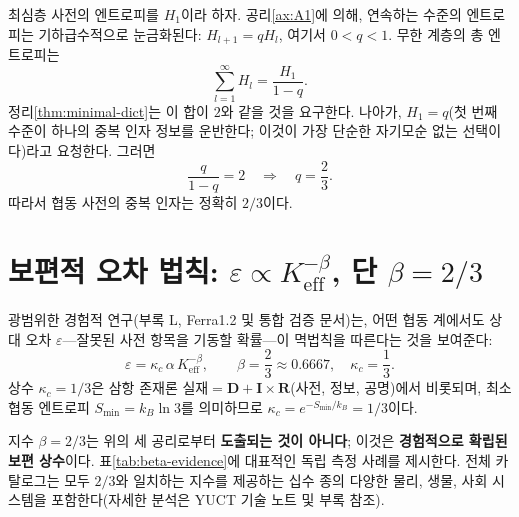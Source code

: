 \documentclass[12pt,a4paper]{article}
\begin{document}
	최심층 사전의 엔트로피를 \(H_1\)이라 하자. 공리\ref{ax:A1}에 의해, 연속하는 수준의 엔트로피는 기하급수적으로 눈금화된다: \(H_{l+1} = q H_l\), 여기서 \(0 < q < 1\). 무한 계층의 총 엔트로피는
	\[
	\sum_{l=1}^{\infty} H_l = \frac{H_1}{1-q}.
	\]
	정리\ref{thm:minimal-dict}는 이 합이 \(2\)와 같을 것을 요구한다. 나아가, \(H_1 = q\)(첫 번째 수준이 하나의 중복 인자 정보를 운반한다; 이것이 가장 단순한 자기모순 없는 선택이다)라고 요청한다. 그러면
	\begin{equation}
		\frac{q}{1-q} = 2 \quad\Longrightarrow\quad \boxed{q = \frac{2}{3}}.
		\label{eq:q}
	\end{equation}
	따라서 협동 사전의 중복 인자는 정확히 \(2/3\)이다.
	
	\section{보편적 오차 법칙: \(\varepsilon \propto K_{\mathrm{eff}}^{-\beta}\), 단 \(\beta = 2/3\)}
	
	광범위한 경험적 연구(부록 L, Ferra1.2 및 통합 검증 문서)는, 어떤 협동 계에서도 상대 오차 \(\varepsilon\)—잘못된 사전 항목을 기동할 확률—이 멱법칙을 따른다는 것을 보여준다:
	\begin{equation}
		\boxed{\varepsilon = \kappa_c \, \alpha \, K_{\mathrm{eff}}^{-\beta}, \qquad \beta = \frac{2}{3} \approx 0.6667,\quad \kappa_c = \frac{1}{3}}.
		\label{eq:error-law}
	\end{equation}
	상수 \(\kappa_c = 1/3\)은 삼항 존재론 \(\text{실재} = \mathbf{D} + \mathbf{I} \times \mathbf{R}\)(사전, 정보, 공명)에서 비롯되며, 최소 협동 엔트로피 \(S_{\min} = k_B \ln 3\)를 의미하므로 \(\kappa_c = e^{-S_{\min}/k_B} = 1/3\)이다.
	
	지수 \(\beta = 2/3\)는 위의 세 공리로부터 \textbf{도출되는 것이 아니다}; 이것은 \textbf{경험적으로 확립된 보편 상수}이다. 표\ref{tab:beta-evidence}에 대표적인 독립 측정 사례를 제시한다. 전체 카탈로그는 모두 \(2/3\)와 일치하는 지수를 제공하는 십수 종의 다양한 물리, 생물, 사회 시스템을 포함한다(자세한 분석은 YUCT 기술 노트 및 부록 참조).
	
\end{document}
